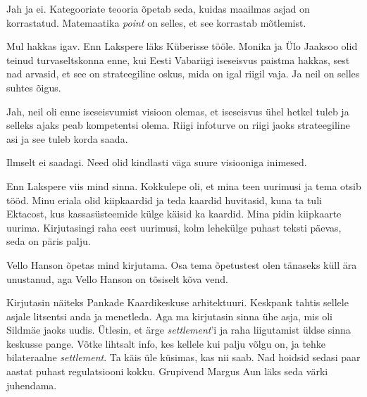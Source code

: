 
Jah ja ei. Kategooriate teooria õpetab seda, kuidas maailmas 
asjad on korrastatud. Matemaatika \emph{point} on selles, et see korrastab 
mõtlemist.


Mul hakkas igav. Enn Lakspere
läks Küberisse tööle. Monika ja Ülo Jaaksoo olid 
teinud turvaseltskonna enne, kui Eesti Vabariigi iseseisvus paistma 
hakkas, sest nad arvasid, et see on strateegiline oskus, mida on igal riigil 
vaja. Ja neil on selles suhtes õigus.


Jah, neil oli enne iseseisvumist visioon olemas, et iseseisvus 
ühel hetkel tuleb ja selleks ajaks peab kompetentsi olema. Riigi 
infoturve on riigi jaoks strateegiline asi ja see tuleb korda saada.


Ilmselt ei saadagi. Need olid kindlasti väga suure visiooniga inimesed. 


Enn Lakspere viis mind sinna. Kokkulepe oli, et mina teen uurimusi ja tema otsib 
tööd. Minu eriala olid kiipkaardid ja teda kaardid huvitasid, kuna ta tuli 
Ektacost, kus kassasüsteemide külge käisid ka kaardid. Mina pidin kiipkaarte 
uurima. Kirjutasingi raha eest uurimusi, kolm lehekülge puhast teksti 
päevas, seda on päris palju.

Vello Hanson õpetas mind kirjutama. Osa tema 
õpetustest olen tänaseks küll ära unustanud, aga Vello Hanson on tõsiselt kõva 
vend. 

Kirjutasin näiteks Pankade Kaardikeskuse arhitektuuri. Keskpank tahtis sellele asjale litsentsi anda ja 
menetleda. Aga ma kirjutasin sinna ühe asja, mis oli 
Sildmäe jaoks uudis. Ütlesin, et ärge \emph{settlement}'i ja 
raha liigutamist üldse sinna 
keskusse pange. Võtke lihtsalt info, kes kellele kui palju võlgu on, ja tehke 
bilateraalne \emph{settlement}. Ta käis üle küsimas, 
kas nii saab. Nad hoidsid sedasi paar aastat 
puhast regulatsiooni kokku. Grupivend Margus Aun 
läks seda värki juhendama. 

